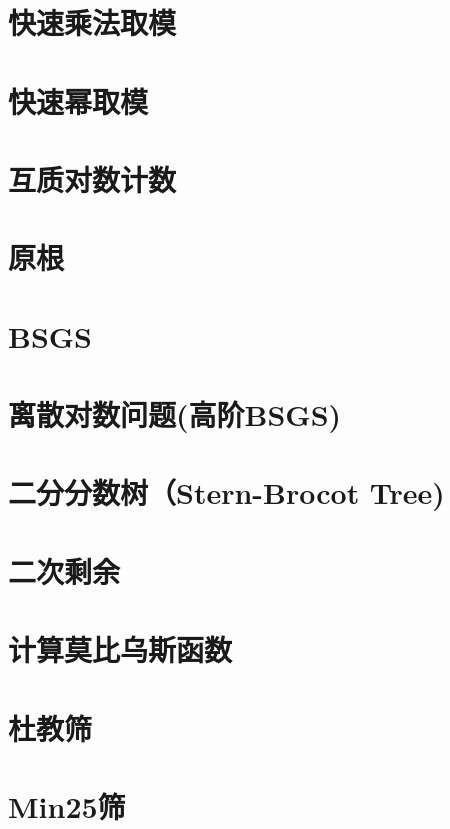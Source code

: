 \section{快速乘法取模}
\raggedbottom
\hrulefill
\section{快速幂取模}
\raggedbottom
\hrulefill
\section{互质对数计数}
\raggedbottom
\hrulefill
\section{原根}
\raggedbottom
\hrulefill
\section{BSGS}
\raggedbottom
\hrulefill
\section{离散对数问题(高阶BSGS)}
\raggedbottom
\hrulefill
\section{二分分数树（Stern-Brocot Tree)}
\raggedbottom
\hrulefill
\section{	二次剩余}
\raggedbottom
\hrulefill
\section{计算莫比乌斯函数}
\raggedbottom
\hrulefill
\section{杜教筛}
\raggedbottom
\hrulefill
\section{Min25筛}
\raggedbottom
\hrulefill
